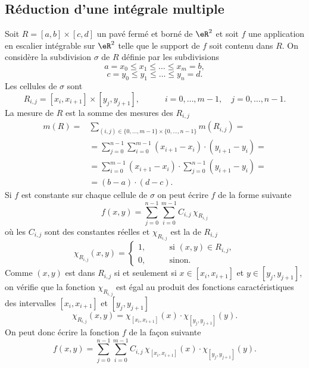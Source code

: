\subsection{Réduction d'une intégrale multiple}
 
Soit $R=[a,b]\times[c,d]$ un pavé fermé et borné de $\eR^2$ et soit $f$ une application en escalier intégrable sur $\eR^2$ telle que le support de $f$ soit contenu dans $R$. On considère la subdivision $\sigma$ de $R$ définie par les subdivisions 
\[
a=x_0\leq x_1\leq\ldots\leq x_m=b,
\]  
 \[
c=y_0\leq y_1\leq\ldots\leq y_n=d.
\]  
Les cellules de $\sigma$ sont 
\[
R_{i,j}=[x_{i},x_{i+1}]\times[y_{j},y_{j+1}], \quad\qquad i=0,\ldots,m-1, \quad j=0,\ldots,n-1.
\]
La mesure de $R$ est la somme des mesures des $R_{i,j}$
\begin{equation}
  \begin{aligned}
    m(R)=&\sum_{(i,j)\in \{0,\ldots, m-1\}\times\{0,\ldots, n-1\}} m(R_{i,j})=\\
&=\sum_{j=0}^{n-1}\sum_{i=0}^{m-1}(x_{i+1}-x_{i})\cdot(y_{i+1}-y_{i})=\\
&=\sum_{i=0}^{m-1}(x_{i+1}-x_{i})\cdot\sum_{j=0}^{n-1}(y_{i+1}-y_{i})=\\
&= (b-a)\cdot(d-c).
  \end{aligned}
\end{equation}
Si $f$ est constante sur chaque cellule de $\sigma$ on peut écrire $f$ de la forme suivante
\[
f(x,y)=\sum_{j=0}^{n-1}\sum_{i=0}^{m-1}C_{i,j}\,\chi_{R_{i,j}}
\]
où les $C_{i,j}$ sont des constantes réelles et $\chi_{R_{i,j}}$ est la  de $R_{i,j}$
\begin{equation}
  \chi_{R_{i,j}}(x,y)=\left\{
      \begin{array}{ll}
      1,\qquad &\textrm{si } (x,y)\in R_{i,j} ,\\
0, & \textrm{sinon}.
      \end{array}\right.
\end{equation}
Comme $(x,y)$ est dans $R_{i,j}$ si et seulement si $x\in[x_{i},x_{i+1}]$ et $ y\in[y_{j},y_{j+1}]$, on vérifie que la fonction $\chi_{R_{i,j}}$ est égal au produit des fonctions caractéristiques des intervalles $[x_{i},x_{i+1}]$ et $[y_{j},y_{j+1}]$ 
\[
 \chi_{R_{i,j}}(x,y)=\chi_{[x_{i},x_{i+1}]}(x)\cdot\chi_{[y_{j},y_{j+1}]}(y).
\] 
On peut donc écrire la fonction $f$ de la façon suivante
\[
f(x,y)=\sum_{j=0}^{n-1}\sum_{i=0}^{m-1}C_{i,j}\,\chi_{[x_{i},x_{i+1}]}(x)\cdot\chi_{[y_{j},y_{j+1}]}(y).
\] 
